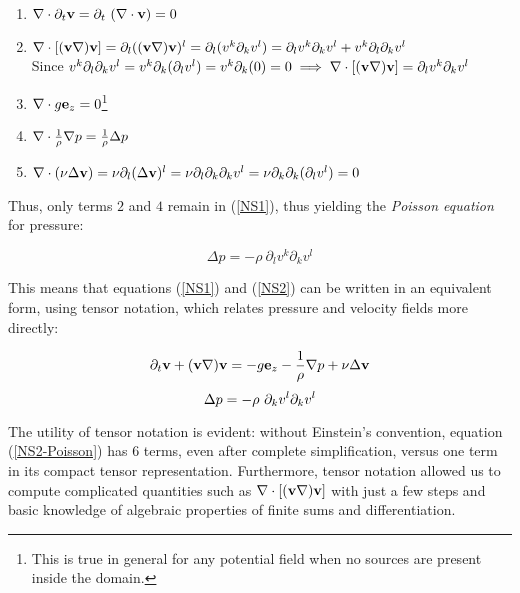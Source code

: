 \begin{enumerate}
 \item $\nabla\cdot \partial_t\mathbf{v} = \partial_t \ (\nabla\cdot \mathbf{v}) = 0$
 \item $\nabla\cdot [(\mathbf{v}\nabla)\mathbf{v}] = \partial_l((\mathbf{v}\nabla)\mathbf{v})^l = \partial_l(v^k\partial_kv^l) = \partial_lv^k\partial_kv^l + v^k\partial_l\partial_kv^l$ \\Since $v^k\partial_l\partial_kv^l = v^k\partial_k(\partial_lv^l) = v^k\partial_k (0) = 0 \implies \nabla\cdot [(\mathbf{v}\nabla)\mathbf{v}] = \partial_lv^k\partial_kv^l$
 \item $\nabla\cdot g\mathbf{e}_z = 0$\footnote{This is true in general for any potential field when no sources are present inside the domain.}
 \item $\nabla\cdot\frac{1}{\rho}\nabla p = \frac{1}{\rho}\Delta p$
 \item $\nabla\cdot (\nu\Delta\mathbf{v}) = \nu\partial_l(\Delta\mathbf{v})^l = \nu\partial_l\partial_k\partial_kv^l = \nu\partial_k\partial_k(\partial_lv^l) = 0$
\end{enumerate}

Thus, only terms $2$ and $4$ remain in (\ref{NS1}), thus yielding the \emph{Poisson equation} for pressure:

\begin{equation}
\Delta p = - \rho ~\partial_lv^k\partial_kv^l
\end{equation}

This means that equations (\ref{NS1}) and (\ref{NS2}) can be written in an equivalent form, using tensor notation, which relates pressure and velocity fields more directly:

\begin{equation} \label{NS1-Poisson}
\partial_t\mathbf{v} + (\mathbf{v}\nabla)\mathbf{v} = -g\mathbf{e}_z - \frac{1}{\rho}\nabla p + \nu\Delta\mathbf{v} 
\end{equation}
\begin{equation} \label{NS2-Poisson}
\Delta p = - \rho ~\partial_kv^l\partial_kv^l
\end{equation}

The utility of tensor notation is evident: without Einstein's convention, equation (\ref{NS2-Poisson}) has $6$ terms, even after complete simplification, versus one term in its compact tensor representation. Furthermore, tensor notation allowed us to compute complicated quantities such as $\nabla\cdot [(\mathbf{v}\nabla)\mathbf{v}]$ with just a few steps and basic knowledge of algebraic properties of finite sums and differentiation.


